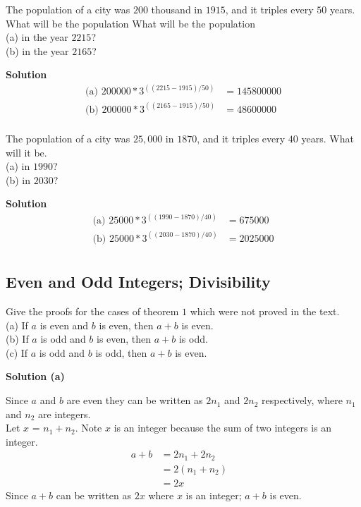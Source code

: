 \begin{tcolorbox}[title=Problem 32, breakable]
The population of a city was $200$ thousand in $1915$, and it triples every
$50$ years. What will be the population What will be the population \\
(a) in the year $2215$? \\
(b) in the year $2165$? \\
\end{tcolorbox}

\textbf{Solution}
\begin{align*}
\text{(a) } 200000 * 3^{((2215 - 1915) / 50)} &= 145800000 \\
\text{(b) } 200000 * 3^{((2165 - 1915) / 50)} &= 48600000 \\
\end{align*}

\begin{tcolorbox}[title=Problem 33, breakable]
The population of a city was $25,000$ in $1870$, and it triples every $40$ years.
What will it be. \\
(a) in $1990$? \\
(b) in $2030$? \\
\end{tcolorbox}

\textbf{Solution}
\begin{align*}
\text{(a) } 25000 * 3^{((1990 - 1870) / 40)} &= 675000 \\
\text{(b) } 25000 * 3^{((2030 - 1870) / 40)} &= 2025000 \\
\end{align*}

\subsection{Even and Odd Integers; Divisibility}

\begin{tcolorbox}[title=Problem 1, breakable]
Give the proofs for the cases of theorem $1$ which were not proved in the text. \\
(a) If $a$ is even and $b$ is even, then $a + b$ is even. \\
(b) If $a$ is odd and $b$ is even, then $a + b$ is odd. \\
(c) If $a$ is odd and $b$ is odd, then $a + b$ is even. 
\end{tcolorbox}

\textbf{Solution (a)}

Since $a$ and $b$ are even they can be written as $2n_1$ and $2n_2$ respectively,
where $n_1$ and $n_2$ are integers. \\
Let $x$ = $n_1 + n_2$. Note $x$ is an integer because the sum of two integers is an integer. \\
\begin{align*}
a + b &= 2n_1 + 2n_2 & \\
&= 2(n_1 + n_2) & \\
&= 2x 
\end{align*}
Since $a + b$ can be written as $2x$ where $x$ is an integer; $a + b$ is even.

